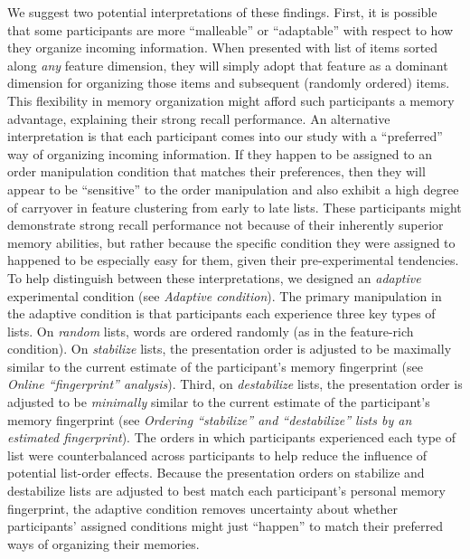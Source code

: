 \documentclass[11pt]{article}
\begin{document}
We suggest two potential interpretations of these findings. First, it is
possible that some participants are more ``malleable'' or ``adaptable'' with
respect to how they organize incoming information. When presented with list of
items sorted along \textit{any} feature dimension, they will simply adopt that
feature as a dominant dimension for organizing those items and subsequent
(randomly ordered) items. This flexibility in memory organization might afford
such participants a memory advantage, explaining their strong recall
performance. An alternative interpretation is that each participant comes into
our study with a ``preferred'' way of organizing incoming information. If they
happen to be assigned to an order manipulation condition that matches their
preferences, then they will appear to be ``sensitive'' to the order
manipulation and also exhibit a high degree of carryover in feature clustering
from early to late lists. These participants might demonstrate strong recall
performance not because of their inherently superior memory abilities, but
rather because the specific condition they were assigned to happened to be
especially easy for them, given their pre-experimental tendencies. To help
distinguish between these interpretations, we designed an \textit{adaptive}
experimental condition (see \textit{Adaptive condition}). The primary
manipulation in the adaptive condition is that participants each experience
three key types of lists. On \textit{random} lists, words are ordered randomly
(as in the feature-rich condition). On \textit{stabilize} lists, the
presentation order is adjusted to be maximally similar to the current estimate
of the participant's memory fingerprint (see \textit{Online “fingerprint”
analysis}). Third, on \textit{destabilize} lists, the presentation order is
adjusted to be \textit{minimally} similar to the current estimate of the
participant's memory fingerprint (see \textit{Ordering ``stabilize'' and
``destabilize'' lists by an estimated fingerprint}). The orders in which
participants experienced each type of list were counterbalanced across
participants to help reduce the influence of potential list-order effects.
Because the presentation orders on stabilize and destabilize lists are adjusted
to best match each participant's personal memory fingerprint, the adaptive
condition removes uncertainty about whether participants' assigned conditions
might just ``happen'' to match their preferred ways of organizing their
memories.
\end{document}
